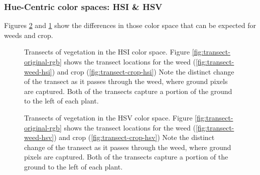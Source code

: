 \documentclass[letterpaper]{report}
\begin{document}
\subsubsection{Hue-Centric color spaces: HSI \& HSV}
Figures \ref{fig:transects-hsv} and \ref{fig:transects-hsi} show the differences in those color space that can be expected for weeds and crop.

\begin{figure}[!htb]
	\centering
	\hfill
	\hfill
	\caption[HSI Transects]{Transects of vegetation in the HSI color space. Figure \ref{fig:transect-original-rgb} shows the transect locations for the weed (\ref{fig:transect-weed-hsi}) and crop (\ref{fig:transect-crop-hsi}) Note the distinct change of the transect as it passes through the weed, where ground pixels are captured. Both of the transects capture a portion of the ground to the left of each plant.}
	\label{fig:transects-hsi}
\end{figure}

\begin{figure}[!htb]
	\centering
	\hfill
	\hfill
	\caption[HSV Transects]{Transects of vegetation in the HSV color space. Figure \ref{fig:transect-original-rgb} shows the transect locations for the weed (\ref{fig:transect-weed-hsv}) and crop (\ref{fig:transect-crop-hsv}) Note the distinct change of the transect as it passes through the weed, where ground pixels are captured. Both of the transects capture a portion of the ground to the left of each plant.}
	\label{fig:transects-hsv}
\end{figure}
\end{document}
